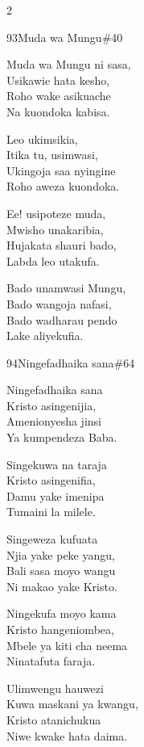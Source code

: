 \begin{multicols}{2}
\begin{hymn}{93}{Muda wa Mungu}{\#40}
\begin{stanza}
Muda wa Mungu ni sasa,\\
Usikawie hata kesho,\\
Roho wake asikuache\\
Na kuondoka kabisa.
\end{stanza}
\begin{chorus}
Leo ukimsikia,\\
Itika tu, usimwasi,\\
Ukingoja saa nyingine\\
Roho aweza kuondoka.
\end{chorus}
\begin{stanza}
Ee! usipoteze muda,\\
Mwisho unakaribia,\\
Hujakata shauri bado,\\
Labda leo utakufa.
\end{stanza}
\begin{stanza}
Bado unamwasi Mungu,\\
Bado wangoja nafasi,\\
Bado wadharau pendo\\
Lake aliyekufia.
\end{stanza}
\end{hymn}

\begin{hymn}{94}{Ningefadhaika sana}{\#64}
\begin{stanza}
Ningefadhaika sana\\
Kristo asingenijia,\\
Amenionyesha jinsi\\
Ya kumpendeza Baba.
\end{stanza}
\begin{stanza}
Singekuwa na taraja\\
Kristo asingenifia,\\
Damu yake imenipa\\
Tumaini la milele.
\end{stanza}
\begin{stanza}
Singeweza kufuata\\
Njia yake peke yangu,\\
Bali sasa moyo wangu\\
Ni makao yake Kristo.
\end{stanza}
\begin{stanza}
Ningekufa moyo kama\\
Kristo hangeniombea,\\
Mbele ya kiti cha neema\\
Ninatafuta faraja.
\end{stanza}
\begin{stanza}
Ulimwengu hauwezi\\
Kuwa maskani ya kwangu,\\
Kristo atanichukua\\
Niwe kwake hata daima.
\end{stanza}
\end{hymn}


\end{multicols}

